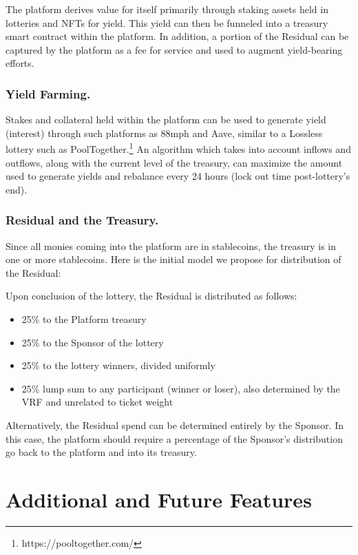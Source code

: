 \documentclass[runningheads]{llncs}
\begin{document}
The platform derives value for itself primarily through staking assets held in lotteries and NFTs for yield.  This yield can then be funneled into a treasury smart contract within the platform.  In addition, a portion of the Residual can be captured by the platform as a fee for service and used to augment yield-bearing efforts.

\subsubsection{Yield Farming.}  Stakes and collateral held within the platform can be used to generate yield (interest) through such platforms as 88mph and Aave, similar to a Lossless lottery such as PoolTogether.\footnote{https://pooltogether.com/}   An algorithm which takes into account inflows and outflows, along with the current level of the treasury, can maximize the amount used to generate yields and rebalance every 24 hours (lock out time post-lottery’s end).  

\subsubsection{Residual and the Treasury.}  Since all monies coming into the platform are in stablecoins, the treasury is in one or more stablecoins.  Here is the initial model we propose for distribution of the Residual:

\noindent Upon conclusion of the lottery, the Residual is distributed as follows:
\begin{itemize}
\item 25\% to the Platform treasury
\item 25\% to the Sponsor of the lottery
\item 25\% to the lottery winners, divided uniformly
\item 25\% lump sum to any participant (winner or loser), also determined by the VRF and unrelated to ticket weight
\end{itemize}

Alternatively, the Residual spend can be determined entirely by the Sponsor.  In this case, the platform should require a percentage of the Sponsor’s distribution go back to the platform and into its treasury. 


\section{Additional and Future Features}\label{section-FutureFeaturesGrowth}
\end{document}
